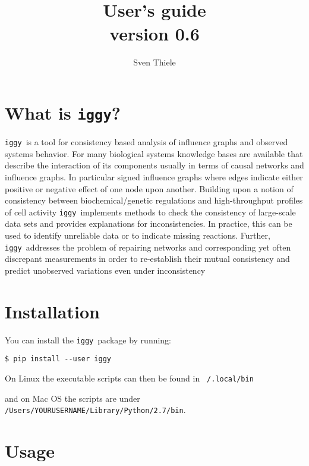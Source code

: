 \documentclass{article}
\title{ \iggy  \\
User's guide \\
version 0.6
}
\author{Sven Thiele}
\date{}
\newcommand\iggy{\texttt{iggy}}
\begin{document}
\maketitle


\section{What is \iggy?}

\iggy\ is a tool for consistency based analysis of influence graphs and observed systems behavior.
For many biological systems knowledge bases are available that describe the interaction of its components 
 usually in terms of causal networks and influence graphs. 
In particular signed influence graphs where edges indicate either positive or negative effect of one node upon another.
Building upon a notion of consistency between biochemical/genetic regulations and high-throughput profiles of cell activity
\iggy\ implements methods to check the consistency of large-scale data sets and
 provides explanations for inconsistencies. 
In practice, this can be used to identify unreliable data or to indicate missing reactions. 
Further, \iggy\ addresses the problem of repairing networks and corresponding yet often discrepant measurements
in order to re-establish their mutual consistency and predict unobserved variations even under inconsistency
 
 
\section{Installation}

You can install the \iggy\ package by running:

\begin{Verbatim}[frame=single]
$ pip install --user iggy
\end{Verbatim} 


On Linux the executable scripts can then be found in \texttt{~/.local/bin}

and on Mac OS the scripts are under \texttt{/Users/YOURUSERNAME/Library/Python/2.7/bin}.



\section{Usage}
\end{document}

